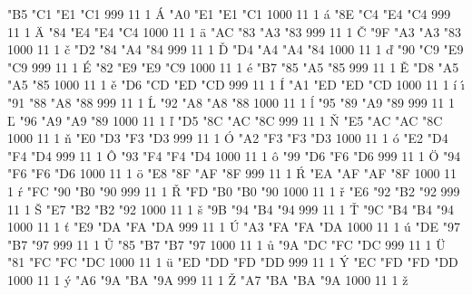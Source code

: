 
  

\setcharcode  "B5  "C1  "E1  "C1   999  11  1  \texaccent \'A
\setcharcode  "A0  "E1  "E1  "C1  1000  11  1  \texaccent \'a
\setcharcode  "8E  "C4  "E4  "C4   999  11  1  \texaccent \"A
\setcharcode  "84  "E4  "E4  "C4  1000  11  1  \texaccent \"a
\setcharcode  "AC  "83  "A3  "83   999  11  1  \texaccent \v C
\setcharcode  "9F  "A3  "A3  "83  1000  11  1  \texaccent \v c
\setcharcode  "D2  "84  "A4  "84   999  11  1  \texaccent \v D
\setcharcode  "D4  "A4  "A4  "84  1000  11  1  \texaccent \v d
\setcharcode  "90  "C9  "E9  "C9   999  11  1  \texaccent \'E
\setcharcode  "82  "E9  "E9  "C9  1000  11  1  \texaccent \'e
\setcharcode  "B7  "85  "A5  "85   999  11  1  \texaccent \v E
\setcharcode  "D8  "A5  "A5  "85  1000  11  1  \texaccent \v e
\setcharcode  "D6  "CD  "ED  "CD   999  11  1  \texaccent \'I
\setcharcode  "A1  "ED  "ED  "CD  1000  11  1  \texaccent \'i  \texaccent \'\i
\setcharcode  "91  "88  "A8  "88   999  11  1  \texaccent \'L
\setcharcode  "92  "A8  "A8  "88  1000  11  1  \texaccent \'l
\setcharcode  "95  "89  "A9  "89   999  11  1  \texaccent \v L
\setcharcode  "96  "A9  "A9  "89  1000  11  1  \texaccent \v l
\setcharcode  "D5  "8C  "AC  "8C   999  11  1  \texaccent \v N
\setcharcode  "E5  "AC  "AC  "8C  1000  11  1  \texaccent \v n
\setcharcode  "E0  "D3  "F3  "D3   999  11  1  \texaccent \'O
\setcharcode  "A2  "F3  "F3  "D3  1000  11  1  \texaccent \'o
\setcharcode  "E2  "D4  "F4  "D4   999  11  1  \texaccent \^O
\setcharcode  "93  "F4  "F4  "D4  1000  11  1  \texaccent \^o
\setcharcode  "99  "D6  "F6  "D6   999  11  1  \texaccent \"O
\setcharcode  "94  "F6  "F6  "D6  1000  11  1  \texaccent \"o
\setcharcode  "E8  "8F  "AF  "8F   999  11  1  \texaccent \'R
\setcharcode  "EA  "AF  "AF  "8F  1000  11  1  \texaccent \'r
\setcharcode  "FC  "90  "B0  "90   999  11  1  \texaccent \v R
\setcharcode  "FD  "B0  "B0  "90  1000  11  1  \texaccent \v r
\setcharcode  "E6  "92  "B2  "92   999  11  1  \texaccent \v S
\setcharcode  "E7  "B2  "B2  "92  1000  11  1  \texaccent \v s
\setcharcode  "9B  "94  "B4  "94   999  11  1  \texaccent \v T
\setcharcode  "9C  "B4  "B4  "94  1000  11  1  \texaccent \v t
\setcharcode  "E9  "DA  "FA  "DA   999  11  1  \texaccent \'U
\setcharcode  "A3  "FA  "FA  "DA  1000  11  1  \texaccent \'u
\setcharcode  "DE  "97  "B7  "97   999  11  1  \texaccent \r U
\setcharcode  "85  "B7  "B7  "97  1000  11  1  \texaccent \r u
\setcharcode  "9A  "DC  "FC  "DC   999  11  1  \texaccent \"U
\setcharcode  "81  "FC  "FC  "DC  1000  11  1  \texaccent \"u
\setcharcode  "ED  "DD  "FD  "DD   999  11  1  \texaccent \'Y
\setcharcode  "EC  "FD  "FD  "DD  1000  11  1  \texaccent \'y
\setcharcode  "A6  "9A  "BA  "9A   999  11  1  \texaccent \v Z
\setcharcode  "A7  "BA  "BA  "9A  1000  11  1  \texaccent \v z

